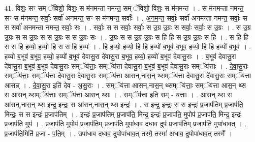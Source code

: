 \documentclass[17pt]{extarticle}
\begin{document}
41. विशः॒ सꣳ सम् ॅविशो॒ विशः॒ स म॑नमन्ता नमन्त॒ सम् ॅविशो॒ विशः॒ स म॑नमन्त । . स म॑नमन्ता नमन्त॒ सꣳ स म॑नमन्त॒ सर्वाः॒ सर्वा॑ अनमन्त॒ सꣳ स म॑नमन्त॒ सर्वाः᳚ । . अ॒न॒म॒न्त॒ सर्वाः॒ सर्वा॑ अनमन्ता नमन्त॒ सर्वाः॒ स स सर्वा॑ अनमन्ता नमन्त॒ सर्वाः॒ सः । . सर्वाः॒ स स सर्वाः॒ सर्वाः॒ स उ॒ग्र उ॒ग्रः स सर्वाः॒ सर्वाः॒ स उ॒ग्रः । . स उ॒ग्र उ॒ग्रः स स उ॒ग्रः स स उ॒ग्रः स स उ॒ग्रः सः । . उ॒ग्रः स स उ॒ग्र उ॒ग्रः स हि हि स उ॒ग्र उ॒ग्रः स हि । . स हि हि स स हि हव्यो॒ हव्यो॒ हि स स हि हव्यः॑ । . हि हव्यो॒ हव्यो॒ हि हि हव्यो॑ ब॒भूव॑ ब॒भूव॒ हव्यो॒ हि हि हव्यो॑ ब॒भूव॑ । . हव्यो॑ ब॒भूव॑ ब॒भूव॒ हव्यो॒ हव्यो॑ ब॒भूव॑ देवासु॒रा दे॑वासु॒रा ब॒भूव॒ हव्यो॒ हव्यो॑ ब॒भूव॑ देवासु॒राः । . ब॒भूव॑ देवासु॒रा दे॑वासु॒रा ब॒भूव॑ ब॒भूव॑ देवासु॒राः सम्ॅय॑त्ताः॒ सम्ॅय॑त्ता देवासु॒रा ब॒भूव॑ 
ब॒भूव॑ देवासु॒राः सम्ॅय॑त्ताः । . दे॒वा॒सु॒राः सम्ॅय॑त्ताः॒ सम्ॅय॑त्ता देवासु॒रा दे॑वासु॒राः सम्ॅय॑त्ता आसन्,नास॒न् थ्सम्ॅय॑त्ता देवासु॒रा दे॑वासु॒राः सम्ॅय॑त्ता आसन्न् । . दे॒वा॒सु॒रा इति॑ देव - अ॒सु॒राः । . सम्ॅय॑त्ता आसन्,नास॒न् थ्सम्ॅय॑त्ताः॒ सम्ॅय॑त्ता आस॒न् थ्स स आ॑स॒न् थ्सम्ॅय॑त्ताः॒ सम्ॅय॑त्ता आस॒न् थ्सः । . सम्ॅय॑त्ता॒ इति॒ सम् - य॒त्ताः॒ । . आ॒स॒न् थ्स स आ॑सन्,नास॒न् थ्स इन्द्र॒ इन्द्रः॒ स आ॑सन्,नास॒न् थ्स इन्द्रः॑ । . स इन्द्र॒ इन्द्रः॒ स स इन्द्रः॑ प्र॒जाप॑तिम् प्र॒जाप॑ति॒ मिन्द्रः॒ स स इन्द्रः॑ प्र॒जाप॑तिम् । . इन्द्रः॑ प्र॒जाप॑तिम् प्र॒जाप॑ति॒ मिन्द्र॒ इन्द्रः॑ प्र॒जाप॑ति॒ मुपोप॑ प्र॒जाप॑ति॒ मिन्द्र॒ इन्द्रः॑ प्र॒जाप॑ति॒ मुप॑ । . प्र॒जाप॑ति॒ मुपोप॑ प्र॒जाप॑तिम् प्र॒जाप॑ति॒ मुपा॑धाव दधाव॒ दुप॑ प्र॒जाप॑तिम् प्र॒जाप॑ति॒ मुपा॑धावत् । . प्र॒जाप॑ति॒मिति॑ प्र॒जा - प॒ति॒म् । . उपा॑धाव दधाव॒ दुपोपा॑धाव॒त् तस्मै॒ तस्मा॑ अधाव॒ दुपोपा॑धाव॒त् तस्मै᳚ । \newline
\end{document}
